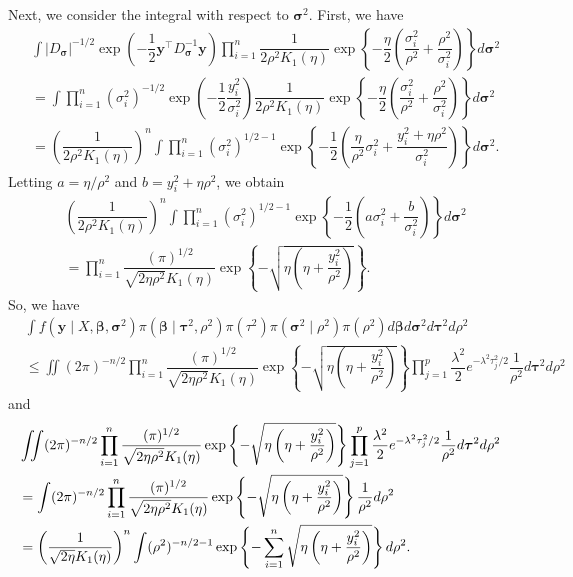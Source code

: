 \documentclass[11pt]{article}
\theoremstyle{plain}
\theoremstyle{definition}
\begin{document}
Next, we consider the integral with respect to $\bm{\sigma}^2$. First, we have
\begin{align*}
&\int|D_{\bm{\sigma}}|^{-1/2}\exp\left(-\dfrac{1}{2}\bm{y}^{\top}D_{\bm\sigma}^{-1}\bm{y}\right) \prod_{i=1}^{n}\dfrac{1}{2\rho^2 K_1(\eta)} \exp\left\{-\dfrac{\eta}{2}\left(\dfrac{\sigma_i^2}{\rho^2}+\dfrac{\rho^2}{\sigma_i^2}\right)\right\}d\bm\sigma^{2}\\
&=\int\prod_{i=1}^{n}(\sigma^{2}_{i})^{-1/2}\exp\left(-\dfrac{1}{2}\dfrac{y_{i}^{2}}{\sigma^{2}_{i}}\right) \dfrac{1}{2\rho^2 K_1(\eta)} \exp\left\{-\dfrac{\eta}{2}\left(\dfrac{\sigma_i^2}{\rho^2}+\dfrac{\rho^2}{\sigma_i^2}\right)\right\}d\bm\sigma^{2}\\
&=\left(\dfrac{1}{2\rho^2 K_1(\eta)}\right)^{n}\int\prod_{i=1}^{n}(\sigma^{2}_{i})^{1/2-1}\exp\left\{-\dfrac{1}{2}\left(\dfrac{\eta}{\rho^2}\sigma_i^2+\dfrac{y_{i}^{2}+\eta\rho^2}{\sigma_i^2}\right)\right\}d\bm\sigma^{2}.
\end{align*}
Letting $a=\eta/\rho^{2}$ and $b=y_{i}^{2}+\eta\rho^{2}$, we obtain
\begin{align*}
&\left(\dfrac{1}{2\rho^2 K_1(\eta)}\right)^{n}\int\prod_{i=1}^{n}(\sigma^{2}_{i})^{1/2-1}\exp\left\{-\dfrac{1}{2}\left(a\sigma_i^2+\dfrac{b}{\sigma_i^2}\right)\right\}d\bm\sigma^{2}\\
&=\prod_{i=1}^{n}\dfrac{(\pi)^{1/2}}{\sqrt{2\eta\rho^2} K_1(\eta)}\exp\left\{-\sqrt{\eta\left(\eta+\dfrac{y_{i}^2}{\rho^{2}}\right)}\right\}.
\end{align*}
So, we have
\begin{align*}
&\int f(\bm{y}\mid X,\bm{\beta},\bm{\sigma}^{2})\pi(\bm{\beta}\mid\bm{\tau}^{2},\rho^{2})\pi({\tau}^{2})\pi(\bm{\sigma}^{2}\mid\rho^{2})\pi(\rho^{2})d\bm{\beta}d\bm{\sigma}^{2}d\bm{\tau}^{2}d\rho^{2}\\
&\leq\iint(2\pi)^{-n/2}\prod_{i=1}^{n}\dfrac{(\pi)^{1/2}}{\sqrt{2\eta\rho^2} K_1(\eta)}\exp\left\{-\sqrt{\eta\left(\eta+\dfrac{y_{i}^2}{\rho^{2}}\right)}\right\}\prod_{j=1}^{p}\dfrac{\lambda^2}{2}e^{-\lambda^{2}\tau_{j}^2/2}\dfrac{1}{\rho^2}d\bm\tau^2 d\rho^2
\end{align*}
and 
\begin{align}\label{propriety_proof}
&\iint(2\pi)^{-n/2}\prod_{i=1}^{n}\dfrac{(\pi)^{1/2}}{\sqrt{2\eta\rho^2} K_1(\eta)}\exp\left\{-\sqrt{\eta\left(\eta+\dfrac{{y}_{i}^2}{\rho^{2}}\right)}\right\}\prod_{j=1}^{p}\dfrac{\lambda^2}{2}e^{-\lambda^{2}\tau_{j}^2/2}\dfrac{1}{\rho^2}d\bm\tau^2 d\rho^2 \notag \\
&=\int(2\pi)^{-n/2}\prod_{i=1}^{n}\dfrac{(\pi)^{1/2}}{\sqrt{2\eta\rho^2} K_1(\eta)}\exp\left\{-\sqrt{\eta\left(\eta+\dfrac{{y}_{i}^2}{\rho^{2}}\right)}\right\}\dfrac{1}{\rho^{2}}d\rho^2 \notag \\
&=\left(\dfrac{1}{\sqrt{2\eta} K_1(\eta)}\right)^{n}\int(\rho^2)^{-n/2-1}\exp\left\{-\sum_{i=1}^n\sqrt{\eta\left(\eta+\dfrac{{y}_{i}^2}{\rho^{2}}\right)}\right\}d\rho^2.
\end{align}
\end{document}
